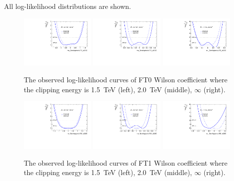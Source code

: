 All log-likelihood distributions are shown.

\begin{figure}[ht]
    \centering
    \includegraphics[width=0.32\textwidth]{figures/aQGC/profileFT01500}
    	\includegraphics[width=0.32\textwidth]{figures/aQGC/profileFT02000}
        \includegraphics[width=0.32\textwidth]{figures/aQGC/profileFT0inf}
        \caption{The observed log-likelihood curves of FT0 Wilson coefficient where the clipping energy is 1.5~TeV (left), 2.0~TeV (middle), $\infty$ (right).}
        \label{fig:ProfileLL}
\end{figure}
\begin{figure}[ht]
    \centering
    \includegraphics[width=0.32\textwidth]{figures/aQGC/profileFT11500}
    	\includegraphics[width=0.32\textwidth]{figures/aQGC/profileFT12000}
        \includegraphics[width=0.32\textwidth]{figures/aQGC/profileFT1inf}
        \caption{The observed log-likelihood curves of FT1 Wilson coefficient where the clipping energy is 1.5~TeV (left), 2.0~TeV (middle), $\infty$ (right).}
        \label{fig:ProfileLL}
\end{figure}

